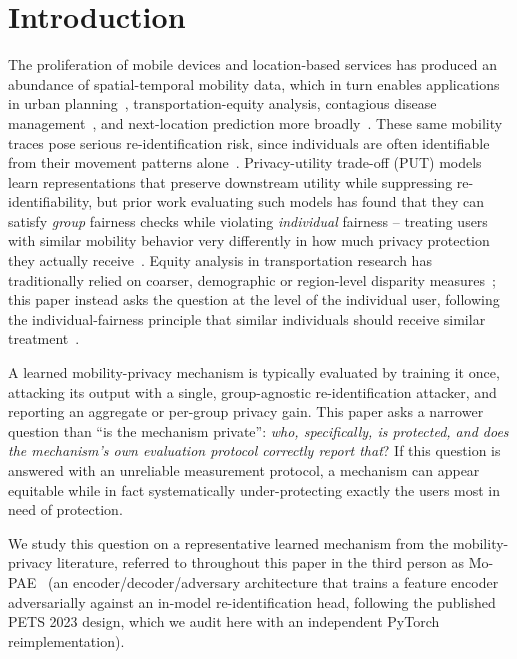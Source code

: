 \section{Introduction}
\label{sec:intro}

The proliferation of mobile devices and location-based services has
produced an abundance of spatial-temporal mobility data, which in turn
enables applications in urban planning~\cite{zheng2014urban,
jayarajah2018understanding}, transportation-equity analysis, contagious
disease management~\cite{eubank2004modelling,
wesolowski2012quantifying, ghadiri2024recreational}, and next-location
prediction more broadly~\cite{luca2021survey}. These same mobility
traces pose serious re-identification risk, since individuals are often
identifiable from their movement patterns
alone~\cite{de2013unique, saleheen2016msieve}. Privacy-utility trade-off
(PUT) models learn representations that preserve downstream utility
while suppressing re-identifiability, but prior work evaluating such
models has found that they can satisfy \emph{group} fairness checks
while violating \emph{individual} fairness -- treating users with
similar mobility behavior very differently in how much privacy
protection they actually receive~\cite{zhan2023analysing}. Equity
analysis in transportation research has traditionally relied on
coarser, demographic or region-level disparity
measures~\cite{yan2020fairness, yan2019fairst, he2025framework}; this
paper instead asks the question at the level of the individual user,
following the individual-fairness principle that similar individuals
should receive similar treatment~\cite{dwork2012fairness}.

A learned mobility-privacy mechanism is typically evaluated by training
it once, attacking its output with a single, group-agnostic
re-identification attacker, and reporting an aggregate or per-group
privacy gain. This paper asks a narrower question than ``is the
mechanism private'': \emph{who, specifically, is protected, and does
the mechanism's own evaluation protocol correctly report that}? If this
question is answered with an unreliable measurement protocol, a
mechanism can appear equitable while in fact systematically
under-protecting exactly the users most in need of protection.

We study this question on a representative learned mechanism from the
mobility-privacy literature, referred to throughout this paper in the
third person as Mo-PAE~\cite{zhan2023mopae} (an encoder/decoder/adversary
architecture that trains a feature encoder adversarially against an
in-model re-identification head, following the published PETS 2023
design, which we audit here with an independent PyTorch
reimplementation).


